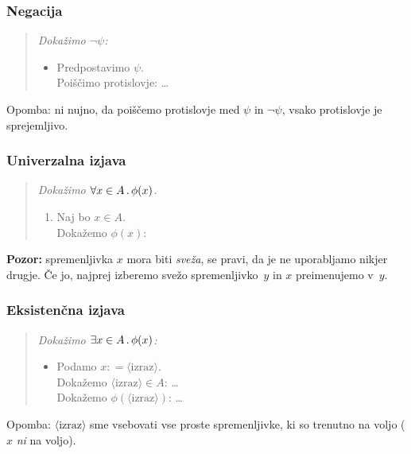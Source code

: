 \subsubsection{Negacija}

\begin{quote}
  \sl
  Dokažimo $\lnot \psi$:
  \begin{itemize}
  \item[] Predpostavimo $\psi$. \\
          Poiščimo protislovje: \quad \dots
  \end{itemize}
\end{quote}
%
Opomba: ni nujno, da poiščemo protislovje med $\psi$ in $\lnot\psi$, vsako protislovje je sprejemljivo.

\subsubsection{Univerzalna izjava}

\begin{quote}
  \sl
  Dokažimo $\forall x \in A \,.\, \phi(x)$.
  \begin{enumerate}
  \item[] Naj bo $x \in A$. \\
          Dokažemo $\phi(x)$: \quad {}
  \end{enumerate}
\end{quote}
%
\textbf{Pozor:} spremenljivka $x$ mora biti \emph{sveža}, se pravi, da je ne uporabljamo nikjer drugje. Če jo, najprej izberemo svežo spremenljivko~$y$ in $x$ preimenujemo v~$y$.

\subsubsection{Eksistenčna izjava}

\begin{quote}
  \sl
  Dokažimo $\exists x \in A \,.\, \phi(x)$:
  \begin{itemize}
  \item[] Podamo $x \mathbin{{:}{=}} \langle\text{izraz}\rangle$. \\
          Dokažemo $\langle\text{izraz}\rangle \in A$: \quad \dots \\
          Dokažemo $\phi(\langle\text{izraz}\rangle)$: \quad \dots
  \end{itemize}
\end{quote}
%
Opomba: $\langle\text{izraz}\rangle$ sme vsebovati vse proste spremenljivke, ki so trenutno na voljo ($x$ \emph{ni} na
voljo).


